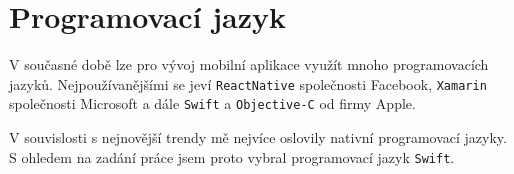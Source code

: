 \section{Programovací jazyk}

V současné době lze pro vývoj mobilní aplikace využít mnoho programovacích jazyků.
Nejpoužívanějšími se jeví \texttt{ReactNative} společnosti Facebook, \texttt{Xamarin} společnosti Microsoft a dále \texttt{Swift} a \texttt{Objective-C} od firmy Apple.

V souvislosti s nejnovější trendy \cite{pypl-popularity} mě nejvíce oslovily nativní programovací jazyky.
S ohledem na zadání práce jsem proto vybral programovací jazyk \texttt{Swift}.
